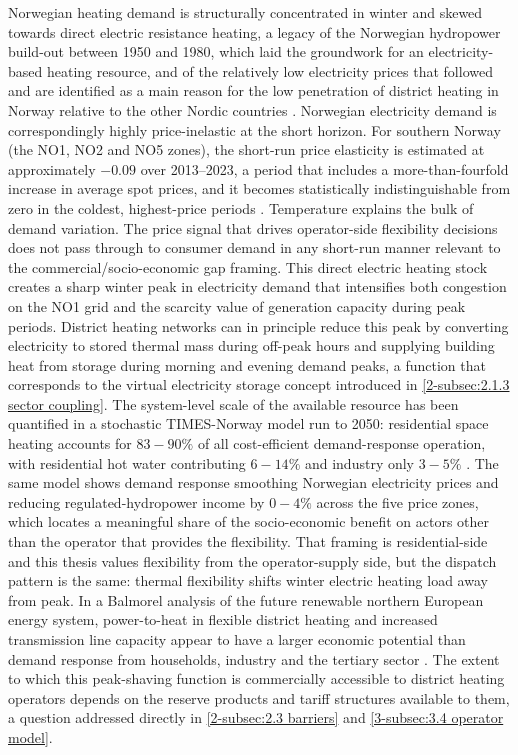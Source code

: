 Norwegian heating demand is structurally concentrated in winter \cite{NVE_langsiktig_2023} and skewed towards direct electric resistance heating, a legacy of the Norwegian hydropower build-out between 1950 and 1980, which laid the groundwork for an electricity-based heating resource, and of the relatively low electricity prices that followed and are identified as a main reason for the low penetration of district heating in Norway relative to the other Nordic countries \cite{sandberg_framework_2018}. Norwegian electricity demand is correspondingly highly price-inelastic at the short horizon. For southern Norway (the NO1, NO2 and NO5 zones), the short-run price elasticity is estimated at approximately $-0.09$ over 2013--2023, a period that includes a more-than-fourfold increase in average spot prices, and it becomes statistically indistinguishable from zero in the coldest, highest-price periods \cite{idso_short-term_2024}. Temperature explains the bulk of demand variation. The price signal that drives operator-side flexibility decisions does not pass through to consumer demand in any short-run manner relevant to the commercial/socio-economic gap framing. This direct electric heating stock creates a sharp winter peak in electricity demand that intensifies both congestion on the NO1 grid and the scarcity value of generation capacity during peak periods. District heating networks can in principle reduce this peak by converting electricity to stored thermal mass during off-peak hours and supplying building heat from storage during morning and evening demand peaks, a function that corresponds to the virtual electricity storage concept introduced in \autoref{2-subsec:2.1.3 sector coupling}. The system-level scale of the available resource has been quantified in a stochastic TIMES-Norway model run to 2050: residential space heating accounts for $83 - 90\%$ of all cost-efficient demand-response operation, with residential hot water contributing $6 - 14\%$ and industry only $3 - 5\%$ \cite{ahang_analysis_2025}. The same model shows demand response smoothing Norwegian electricity prices and reducing regulated-hydropower income by $0 - 4\%$ across the five price zones, which locates a meaningful share of the socio-economic benefit on actors other than the operator that provides the flexibility. That framing is residential-side and this thesis values flexibility from the operator-supply side, but the dispatch pattern is the same: thermal flexibility shifts winter electric heating load away from peak. In a Balmorel analysis of the future renewable northern European energy system, power-to-heat in flexible district heating and increased transmission line capacity appear to have a larger economic potential than demand response from households, industry and the tertiary sector \cite{kirkerud_role_2021}. The extent to which this peak-shaving function is commercially accessible to district heating operators depends on the reserve products and tariff structures available to them, a question addressed directly in \autoref{2-subsec:2.3 barriers} and \autoref{3-subsec:3.4 operator model}.

